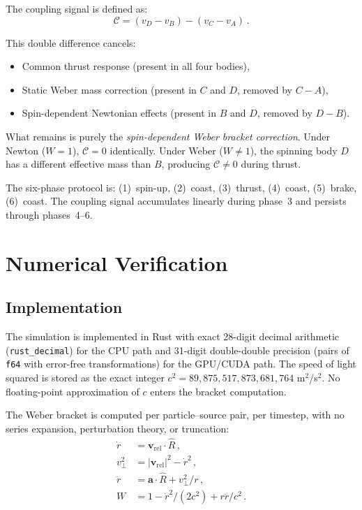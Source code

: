 \documentclass[12pt,preprint,amsmath,amssymb]{revtex4-2}
\begin{document}
The coupling signal is defined as:
\begin{equation}
\label{eq:double_diff}
\mathcal{C} = (v_D - v_B) - (v_C - v_A)\,.
\end{equation}

This double difference cancels:
\begin{itemize}
\item Common thrust response (present in all four bodies),
\item Static Weber mass correction (present in $C$ and $D$, removed by $C - A$),
\item Spin-dependent Newtonian effects (present in $B$ and $D$, removed by $D - B$).
\end{itemize}
What remains is purely the \emph{spin-dependent Weber bracket correction}.
Under Newton ($W = 1$), $\mathcal{C} = 0$ identically.
Under Weber ($W \neq 1$), the spinning body $D$ has a different effective mass
than $B$, producing $\mathcal{C} \neq 0$ during thrust.

The six-phase protocol is: (1)~spin-up, (2)~coast, (3)~thrust, (4)~coast,
(5)~brake, (6)~coast. The coupling signal accumulates linearly during phase~3
and persists through phases~4--6.

\section{Numerical Verification}
\label{sec:numerics}

\subsection{Implementation}

The simulation is implemented in Rust with exact 28-digit decimal arithmetic
(\texttt{rust\_decimal}) for the CPU path and 31-digit double-double precision
(pairs of \texttt{f64} with error-free transformations) for the GPU/CUDA path.
The speed of light squared is stored as the exact integer
$c^2 = 89{,}875{,}517{,}873{,}681{,}764$ m$^2$/s$^2$.
No floating-point approximation of $c$ enters the bracket computation.

The Weber bracket is computed per particle--source pair, per timestep, with
no series expansion, perturbation theory, or truncation:
\begin{align}
\dot{r} &= \mathbf{v}_{\text{rel}} \cdot \hat{R}\,, \\
v_\perp^2 &= |\mathbf{v}_{\text{rel}}|^2 - \dot{r}^2\,, \\
\ddot{r} &= \mathbf{a} \cdot \hat{R} + v_\perp^2/r\,, \\
W &= 1 - \dot{r}^2/(2c^2) + r\ddot{r}/c^2\,.
\end{align}
\end{document}
